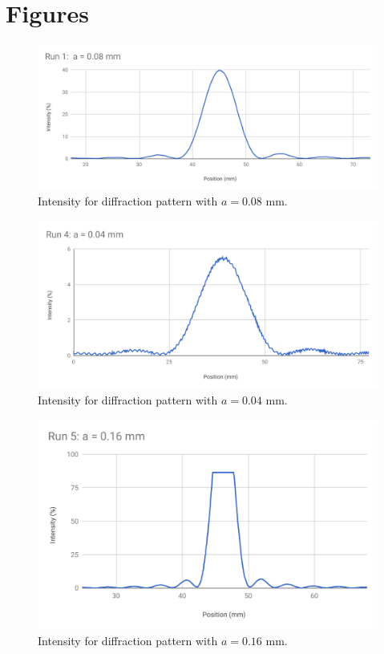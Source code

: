 \section{Figures}
\begin{figure}[ht!]
	\centering
	\includegraphics[scale=0.59]{image/11-diffraction/chart1.pdf}
	\caption{Intensity for diffraction pattern with $a = 0.08$ mm.}
	\label{figure.11.chart1}
\end{figure}
\begin{figure}[ht!]
	\centering
	\includegraphics[scale=0.59]{image/11-diffraction/chart2.pdf}
	\caption{Intensity for diffraction pattern with $a = 0.04$ mm.}
	\label{figure.11.chart2}
\end{figure}
\begin{figure}[ht!]
	\centering
	\includegraphics[scale=0.77]{image/11-diffraction/chart3.pdf}
	\caption{Intensity for diffraction pattern with $a = 0.16$ mm.}
	\label{figure.11.chart3}
\end{figure}
